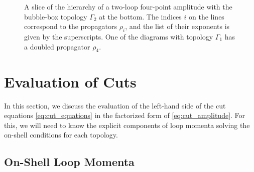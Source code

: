 {\begin{figure}[ht] 
  \centering
%
  \caption{A slice of the hierarchy of a two-loop four-point amplitude with the bubble-box topology $\Gamma_2$ at the bottom.
    The indices $i$ on the lines correspond to the propagators $\rho_i$, and the list of their exponents is given by the superscripts.
    One of the diagrams with topology $\Gamma_1$ has a doubled propagator $\rho_4$.
  }
  \label{fig:example_subleading_pole}
\end{figure}


}

\section{Evaluation of Cuts}
\label{sec:evaluation_of_cuts}

In this section, we discuss the evaluation of the left-hand side of the cut equations \eqref{eq:cut_equations}
in the factorized form of \cref{eq:cut_amplitude}.
For this, we will need to know the explicit components of loop momenta solving the on-shell conditions for each topology.

\subsection{On-Shell Loop Momenta}
\label{sec:osm}

